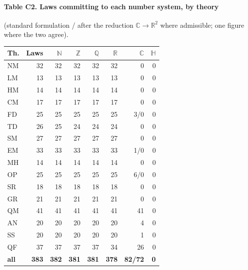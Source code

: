 \paragraph{Table C2. Laws committing to each number system, by theory} (standard formulation / after the reduction $\mathbb C\to\mathbb R^2$ where admissible; one figure where the two agree).
{\footnotesize\setlength{\tabcolsep}{3pt}
\begin{center}
\begin{tabular}{l r r r r r r r }
\toprule
Th. & Laws & $\mathbb N$ & $\mathbb Z$ & $\mathbb Q$ & $\mathbb R$ & $\mathbb C$ & $\mathbb H$ \\
\midrule
NM & 32 & 32 & 32 & 32 & 32 & 0 & 0 \\
LM & 13 & 13 & 13 & 13 & 13 & 0 & 0 \\
HM & 14 & 14 & 14 & 14 & 14 & 0 & 0 \\
CM & 17 & 17 & 17 & 17 & 17 & 0 & 0 \\
FD & 25 & 25 & 25 & 25 & 25 & 3/0 & 0 \\
TD & 26 & 25 & 24 & 24 & 24 & 0 & 0 \\
SM & 27 & 27 & 27 & 27 & 27 & 0 & 0 \\
EM & 33 & 33 & 33 & 33 & 33 & 1/0 & 0 \\
MH & 14 & 14 & 14 & 14 & 14 & 0 & 0 \\
OP & 25 & 25 & 25 & 25 & 25 & 6/0 & 0 \\
SR & 18 & 18 & 18 & 18 & 18 & 0 & 0 \\
GR & 21 & 21 & 21 & 21 & 21 & 0 & 0 \\
QM & 41 & 41 & 41 & 41 & 41 & 41 & 0 \\
AN & 20 & 20 & 20 & 20 & 20 & 4 & 0 \\
SS & 20 & 20 & 20 & 20 & 20 & 1 & 0 \\
QF & 37 & 37 & 37 & 37 & 34 & 26 & 0 \\
\textbf{all} & \textbf{383} & \textbf{382} & \textbf{381} & \textbf{381} & \textbf{378} & \textbf{82/72} & \textbf{0} \\
\bottomrule
\end{tabular}
\end{center}
}
